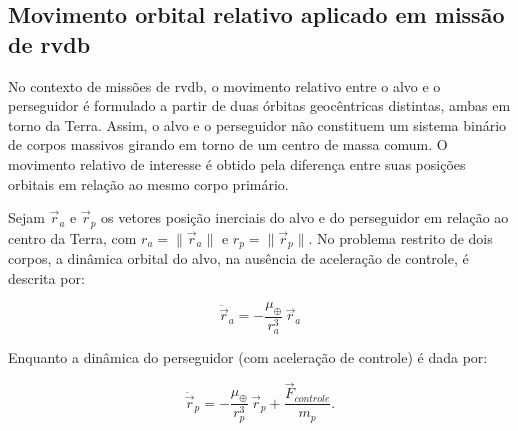 

\subsection{Movimento orbital relativo aplicado em missão de \gls{rvdb}}

No contexto de missões de \gls{rvdb}, o movimento relativo entre o alvo e o perseguidor é formulado a partir de duas órbitas geocêntricas distintas, ambas em torno da Terra. Assim, o alvo e o perseguidor não constituem um sistema binário de corpos massivos girando em torno de um centro de massa comum. O movimento relativo de interesse é obtido pela diferença entre suas posições orbitais em relação ao mesmo corpo primário.

Sejam $\vec r_a$ e $\vec r_p$ os vetores posição inerciais do alvo e do perseguidor em relação ao centro da Terra, com $r_a=\|\vec r_a\|$ e $r_p=\|\vec r_p\|$. No problema restrito de dois corpos, a dinâmica orbital do alvo, na ausência de aceleração de controle, é descrita por:

\begin{equation}
\label{eq_movimentoalvo}
\ddot{\vec r}_a = -\frac{\mu_\oplus}{r_a^3}\,\vec r_a
\end{equation}

Enquanto a dinâmica do perseguidor (com aceleração de controle) é dada por:


\begin{equation}
\label{eq_movimentoperseguidor}
\ddot{\vec r}_p
=
-\frac{\mu_\oplus}{r_{p}^3}\,\vec r_{p}
+
\frac{\vec F_{controle}}{m_{p}}.
\end{equation}

